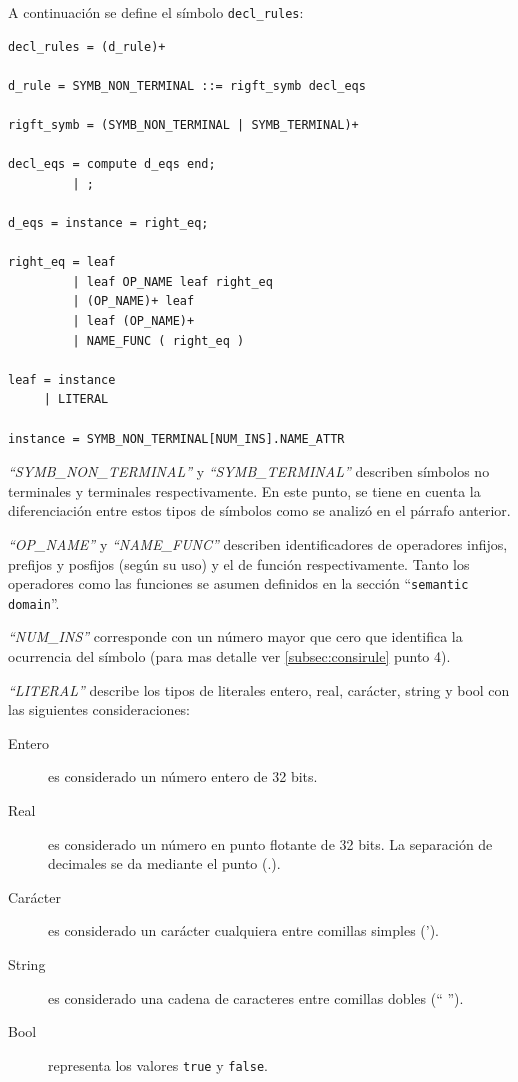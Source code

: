 A continuación se define el símbolo \texttt{decl\_rules}:

\vspace{0.3cm}
\begin{lstlisting}[frame=shadowbox, rulesepcolor=\color{azul}, language=specmag]
decl_rules = (d_rule)+ 

d_rule = SYMB_NON_TERMINAL ::= rigft_symb decl_eqs

rigft_symb = (SYMB_NON_TERMINAL | SYMB_TERMINAL)+

decl_eqs = compute d_eqs end;
         | ;

d_eqs = instance = right_eq;

right_eq = leaf
         | leaf OP_NAME leaf right_eq
         | (OP_NAME)+ leaf
         | leaf (OP_NAME)+
         | NAME_FUNC ( right_eq ) 

leaf = instance
     | LITERAL

instance = SYMB_NON_TERMINAL[NUM_INS].NAME_ATTR
\end{lstlisting}
\vspace{0.3cm}

\textit{``SYMB\_NON\_TERMINAL''} y \textit{``SYMB\_TERMINAL''} describen símbolos no terminales y terminales respectivamente. En este punto, se tiene en cuenta la diferenciación entre estos tipos de símbolos como se analizó en el párrafo anterior.
 
\textit{``OP\_NAME''} y  \textit{``NAME\_FUNC''} describen identificadores de operadores infijos, prefijos y posfijos (según su uso) y el de función respectivamente. Tanto los operadores como las funciones se asumen definidos en la sección ``\texttt{semantic domain}''.

\textit{``NUM\_INS''} corresponde con un número mayor que cero que identifica la ocurrencia del símbolo (para mas detalle ver \ref{subsec:consirule} punto 4).

\textit{``LITERAL''} describe los tipos de literales entero, real, carácter, string y bool con las siguientes consideraciones:

\begin{description}
\item [Entero] es considerado un número entero de 32 bits. 
\item [Real] es considerado un número en punto flotante de 32 bits. La separación de decimales se da mediante el punto (.).
\item [Carácter] es considerado un carácter cualquiera entre comillas simples (').
\item [String] es considerado una cadena de caracteres entre comillas dobles (`` '').
\item [Bool] representa los valores \texttt{true} y \texttt{false}.
\end{description}

